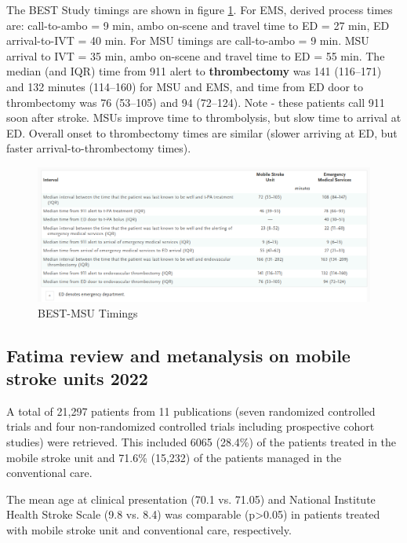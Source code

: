 The BEST Study \cite{grotta_prospective_2021} timings are shown in figure \ref{fig:best_msu_timings}. For EMS, derived process times are: call-to-ambo = 9 min, ambo on-scene and travel time to ED = 27 min, ED arrival-to-IVT = 40 min. For MSU timings are call-to-ambo = 9 min. MSU arrival to IVT = 35 min, ambo on-scene and travel time to ED = 55 min. The median (and IQR) time from 911 alert to \textbf{thrombectomy} was 141 (116–171) and 132 minutes (114–160) for MSU and EMS, and  time from ED door to thrombectomy was 76 (53–105) and 94 (72–124). Note - these patients call 911 soon after stroke. MSUs improve time to thrombolysis, but slow time to arrival at ED. Overall onset to thrombectomy times are similar (slower arriving at ED, but faster arrival-to-thrombectomy times). 

\begin{figure}
    \centering
    \includegraphics[width=0.75\linewidth]{images_background/best_msu_timings.png}
    \caption{BEST-MSU Timings}
    \label{fig:best_msu_timings}
\end{figure}





\subsection{Fatima review and metanalysis on mobile stroke units 2022 \cite{fatima_mobile_2020}
}

A total of 21,297 patients from 11 publications (seven randomized controlled trials and four non-randomized controlled trials including prospective cohort studies) were retrieved. This included 6065 (28.4\%) of the patients treated in the mobile stroke unit and 71.6\% (15,232) of the patients managed in the conventional care.

The mean age at clinical presentation (70.1 vs. 71.05) and National Institute Health Stroke Scale (9.8 vs. 8.4) was comparable (p>0.05) in patients treated with mobile stroke unit and conventional care, respectively.

